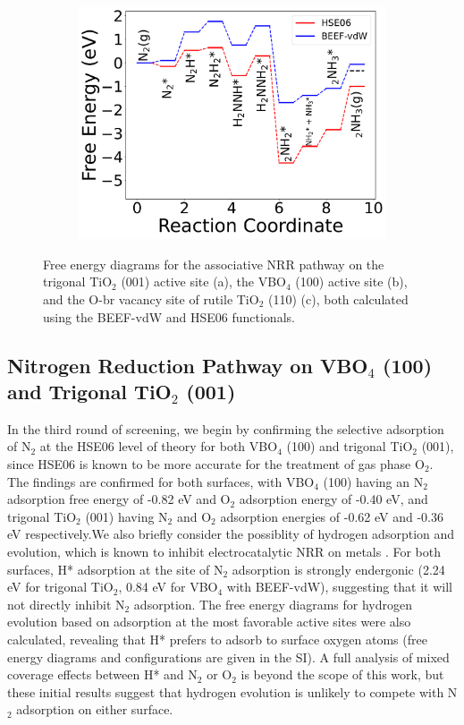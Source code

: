 \begin{figure}
\begin{subfigure}{0.31\columnwidth}
        \centering
        \includegraphics[width=\columnwidth]{figures/metal_oxide_figures/Figure 6c.pdf}
        \caption{}
        \label{fig:ACS_FED}
    \end{subfigure}
    \caption{Free energy diagrams for the associative NRR pathway on the trigonal TiO$_2$ (001) active site (a), the VBO$_4$ (100) active site (b), and the O-br vacancy site of rutile TiO$_2$ (110) (c), both calculated using the BEEF-vdW and HSE06 functionals.}
    \label{fig:combined_FED}
\end{figure}

\subsection{Nitrogen Reduction Pathway on VBO$_4$ (100) and Trigonal TiO$_2$ (001)}
In the third round of screening, we begin by confirming the selective adsorption of N$_2$ at the HSE06 level of theory for both VBO$_4$ (100) and trigonal TiO$_2$ (001), since HSE06 is known to be more accurate for the treatment of gas phase O$_2$. The findings are confirmed for both surfaces, with VBO$_4$ (100) having an N$_2$ adsorption free energy of -0.82 eV and O$_2$ adsorption energy of -0.40 eV, and trigonal TiO$_2$ (001) having N$_2$ and O$_2$ adsorption energies of -0.62 eV and -0.36 eV respectively.We also briefly consider the possiblity of hydrogen adsorption and evolution, which is known to inhibit electrocatalytic NRR on metals \cite{Singh_2017}. For both surfaces, H* adsorption at the site of N$_2$ adsorption is strongly endergonic (2.24 eV for trigonal TiO$_2$, 0.84 eV for VBO$_4$ with BEEF-vdW), suggesting that it will not directly inhibit N$_2$ adsorption. The free energy diagrams for hydrogen evolution based on adsorption at the most favorable active sites were also calculated, revealing that H* prefers to adsorb to surface oxygen atoms (free energy diagrams and configurations are given in the SI). A full analysis of mixed coverage effects between H* and N$_2$ or O$_2$ is beyond the scope of this work, but these initial results suggest that hydrogen evolution is unlikely to compete with N$_2$ adsorption on either surface.

